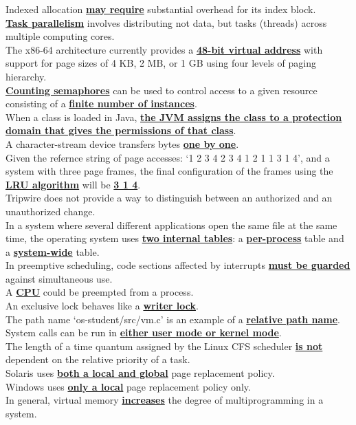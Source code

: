 \documentclass[10pt]{article}
\newcommand{\qw}[1]{\textbf{\ul{#1}}}
\begin{document}
Indexed allocation \qw{may require} substantial overhead for its index block.\\[2mm]
\qw{Task parallelism} involves distributing not data, but tasks (threads) across multiple computing cores.\\[2mm]
The x86-64 architecture currently provides a \qw{48-bit virtual address} with support for page sizes of 4 KB, 2 MB, or 1 GB using four levels of paging hierarchy.\\[2mm]
\qw{Counting semaphores} can be used to control access to a given resource consisting of a \qw{finite number of instances}.\\[2mm] 
When a class is loaded in Java, \qw{the JVM assigns the class to a protection domain that gives the permissions of that class}.\\[2mm]
A character-stream device transfers bytes \qw{one by one}.\\[2mm]
Given the refernce string of page accesses: `1 2 3 4 2 3 4 1 2 1 1 3 1 4', and a system with three page frames, the final configuration of the frames using the \qw{LRU algorithm} will be \qw{3 1 4}.\\[2mm]
Tripwire does not provide a way to distinguish between an authorized and an unauthorized change.\\[2mm]
In a system where several different applications open the same file at the same time, the operating system uses \qw{two internal tables}: a \qw{per-process} table and a \qw{system-wide} table.\\[2mm]
In preemptive scheduling, code sections affected by interrupts \qw{must be guarded} against simultaneous use.\\[2mm]
A \qw{CPU} could be preempted from a process.\\[2mm]
An exclusive lock behaves like a \qw{writer lock}.\\[2mm]
The path name `os-student/src/vm.c' is an example of a \qw{relative path name}.\\[2mm]
System calls can be run in \qw{either user mode or kernel mode}.\\[2mm]
The length of a time quantum assigned by the Linux CFS scheduler \qw{is not} dependent on the relative priority of a task.\\[2mm]
Solaris uses \qw{both a local and global} page replacement policy.\\[2mm]
Windows uses \qw{only a local} page replacement policy only.\\[2mm]
In general, virtual memory \qw{increases} the degree of multiprogramming in a system.\\[2mm]
\end{document}
